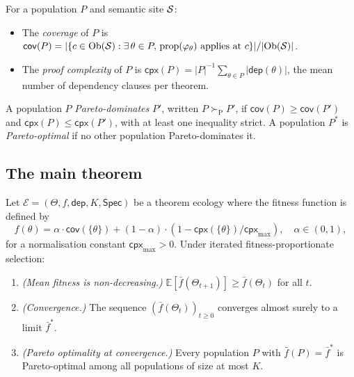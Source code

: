 \documentclass[11pt]{article}
\providecommand{\Eco}{\mathcal{E}}          %
\providecommand{\fit}{f}                    %
\providecommand{\fitbar}{\bar{f}}           %
\providecommand{\Cap}{K}                    %
\providecommand{\dom}{\succ_{\mathrm{P}}}   %
\providecommand{\dep}{\mathsf{dep}}         %
\providecommand{\cov}{\mathsf{cov}}         %
\providecommand{\cpx}{\mathsf{cpx}}         %
\providecommand{\Spc}{\mathsf{Spec}}        %
\begin{document}
\begin{definition}\label{def:obj}
For a population $P$ and semantic site $\mathcal{S}$:
\begin{itemize}[leftmargin=1.5em]
  \item The \emph{coverage} of $P$ is
    $\cov(P) = |\{c \in \Ob(\Site) : \exists\, \theta \in P,\,
    \text{prop}(\varphi_\theta) \text{ applies at } c\}| /
    |\Ob(\Site)|$.
  \item The \emph{proof complexity} of $P$ is
    $\cpx(P) = |P|^{-1}\sum_{\theta \in P} |\dep(\theta)|$,
    the mean number of dependency clauses per theorem.
\end{itemize}
A population $P$ \emph{Pareto-dominates} $P'$, written $P \dom P'$,
if $\cov(P) \geq \cov(P')$ and $\cpx(P) \leq \cpx(P')$, with at
least one inequality strict.  A population $P^*$ is
\emph{Pareto-optimal} if no other population Pareto-dominates it.
\end{definition}

\subsection{The main theorem}

\begin{theorem}\label{thm:stability}
Let $\Eco = (\Theta, \fit, \dep, \Cap, \Spc)$ be a theorem ecology
where the fitness function is defined by
\[
  \fit(\theta) = \alpha \cdot \cov(\{\theta\})
               + (1-\alpha)\cdot(1 - \cpx(\{\theta\})/\cpx_{\max}),
  \quad \alpha \in (0,1),
\]
for a normalisation constant $\cpx_{\max} > 0$.  Under iterated
fitness-proportionate selection:
\begin{enumerate}[leftmargin=1.5em]
  \item[(i)] \emph{(Mean fitness is non-decreasing.)}
    $\mathbb{E}[\fitbar(\Theta_{t+1})] \geq \fitbar(\Theta_t)$
    for all $t$.
  \item[(ii)] \emph{(Convergence.)} The sequence
    $(\fitbar(\Theta_t))_{t\geq 0}$ converges almost surely to a
    limit $\fitbar^*$.
  \item[(iii)] \emph{(Pareto optimality at convergence.)} Every
    population $P$ with $\fitbar(P) = \fitbar^*$ is Pareto-optimal
    among all populations of size at most $\Cap$.
\end{enumerate}
\end{theorem}
\end{document}
